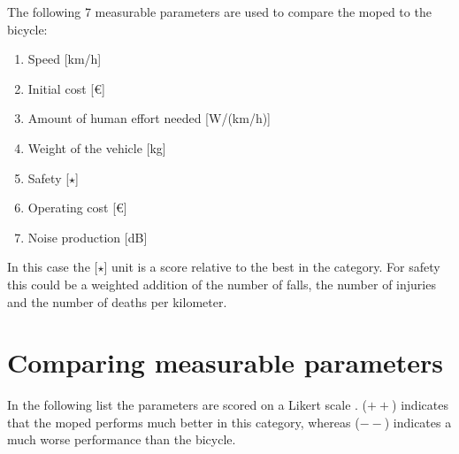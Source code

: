 \documentclass[a4paper]{article}
\begin{document}
The following 7 measurable parameters are used to compare the moped to the bicycle:
\begin{enumerate}
\item Speed [km/h]
\item Initial cost [€]
\item Amount of human effort needed [W/(km/h)]
\item Weight of the vehicle [kg]
\item Safety [$\star$]
\item Operating cost [€]
\item Noise production [dB]
\end{enumerate}

In this case the [$\star$] unit is a score relative to the best in the category.
For safety this could be a weighted addition of the number of falls, the number of injuries and the number of deaths per kilometer.

\section{Comparing measurable parameters}
\label{sec:comparing}

In the following list the parameters are scored on a Likert scale \cite{likert}. ($++$) indicates that the moped performs much better in this category, whereas ($--$) indicates a much worse performance than the bicycle.
\end{document}

